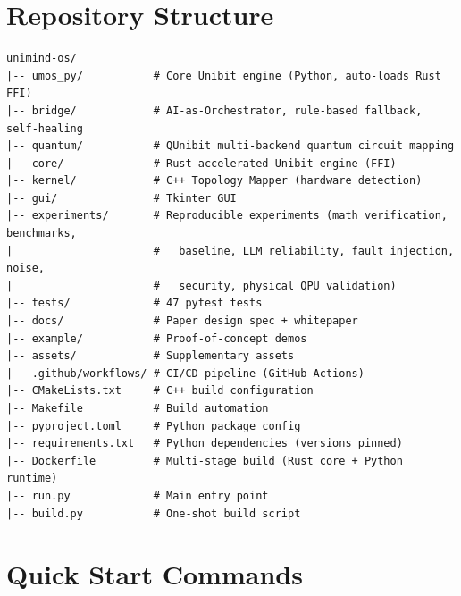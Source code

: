 ﻿\documentclass[12pt,a4paper]{article}
\begin{document}
\newpage
\appendix

\section{Repository Structure}

\begingroup
\footnotesize
\begin{verbatim}
unimind-os/
|-- umos_py/           # Core Unibit engine (Python, auto-loads Rust FFI)
|-- bridge/            # AI-as-Orchestrator, rule-based fallback, self-healing
|-- quantum/           # QUnibit multi-backend quantum circuit mapping
|-- core/              # Rust-accelerated Unibit engine (FFI)
|-- kernel/            # C++ Topology Mapper (hardware detection)
|-- gui/               # Tkinter GUI
|-- experiments/       # Reproducible experiments (math verification, benchmarks,
|                      #   baseline, LLM reliability, fault injection, noise,
|                      #   security, physical QPU validation)
|-- tests/             # 47 pytest tests
|-- docs/              # Paper design spec + whitepaper
|-- example/           # Proof-of-concept demos
|-- assets/            # Supplementary assets
|-- .github/workflows/ # CI/CD pipeline (GitHub Actions)
|-- CMakeLists.txt     # C++ build configuration
|-- Makefile           # Build automation
|-- pyproject.toml     # Python package config
|-- requirements.txt   # Python dependencies (versions pinned)
|-- Dockerfile         # Multi-stage build (Rust core + Python runtime)
|-- run.py             # Main entry point
|-- build.py           # One-shot build script
\end{verbatim}
\endgroup

\section{Quick Start Commands}
\end{document}
